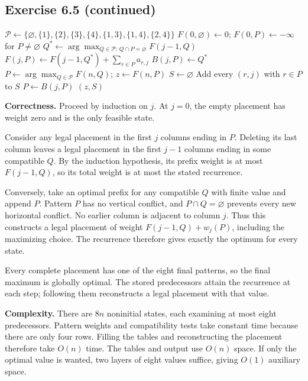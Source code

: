 \documentclass[11pt]{article}
\begin{document}
\subsection*{Exercise 6.5 (continued)}
\begin{algorithm}[H]
\caption{Optimal checkerboard placement}
\begin{algorithmic}[1]
 \State $\mathcal P\gets
 \{\varnothing,\{1\},\{2\},\{3\},\{4\},\{1,3\},\{1,4\},\{2,4\}\}$
 \State $F(0,\varnothing)\gets0$; $F(0,P)\gets-\infty$ for $P\ne\varnothing$
   \State $Q^*\gets\arg\max_{Q\in\mathcal P:\,Q\cap P=\varnothing}F(j-1,Q)$
   \State $F(j,P)\gets F(j-1,Q^*)+\sum_{r\in P}a_{r,j}$
   \State $B(j,P)\gets Q^*$
  \EndFor
 \EndFor
 \State $P\gets\arg\max_{Q\in\mathcal P}F(n,Q)$; $z\gets F(n,P)$
 \State $S\gets\varnothing$
  \State Add every $(r,j)$ with $r\in P$ to $S$
  \State $P\gets B(j,P)$
 \EndFor
 \State \Return $(z,S)$
\EndFunction
\end{algorithmic}
\end{algorithm}

\textbf{Correctness.}
Proceed by induction on $j$. At $j=0$, the empty placement has weight
zero and is the only feasible state.

Consider any legal placement in the first $j$ columns ending in $P$.
Deleting its last column leaves a legal placement in the first $j-1$
columns ending in some compatible $Q$. By the induction hypothesis,
its prefix weight is at most $F(j-1,Q)$, so its total weight is at most
the stated recurrence.

Conversely, take an optimal prefix for any compatible $Q$ with finite
value and append $P$. Pattern $P$ has no vertical conflict, and
$P\cap Q=\varnothing$ prevents every new horizontal conflict. No earlier
column is adjacent to column $j$. Thus this constructs a legal placement
of weight $F(j-1,Q)+w_j(P)$, including the maximizing choice.
The recurrence therefore gives exactly the optimum for every state.

Every complete placement has one of the eight final patterns, so the
final maximum is globally optimal. The stored predecessors attain the
recurrence at each step; following them reconstructs a legal placement
with that value.

\textbf{Complexity.}
There are $8n$ noninitial states, each examining at most eight predecessors.
Pattern weights and compatibility tests take constant time because there
are only four rows. Filling the tables and reconstructing the placement
therefore take $\boxed{O(n)}$ time. The tables and output use $O(n)$
space. If only the optimal value is wanted, two layers of eight values
suffice, giving $O(1)$ auxiliary space.
\end{document}
